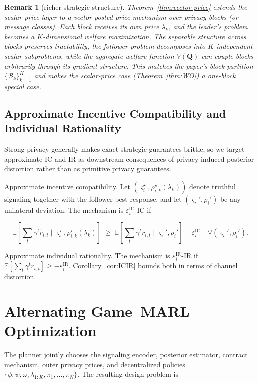 \documentclass{article}
\newtheorem{remark}{Remark}
\begin{document}
\begin{remark}
    [richer strategic structure]
    Theorem~\ref{thm:vector-price} extends the scalar-price layer to a vector posted-price mechanism over privacy blocks (or message classes). Each block receives its own price $\lambda_k$, and the leader's problem becomes a $K$-dimensional welfare maximization. The separable structure across blocks preserves tractability, the follower problem decomposes into $K$ independent scalar subproblems, while the aggregate welfare function $V(\mathbf Q)$ can couple blocks arbitrarily through its gradient structure. This matches the paper's block partition $\{\mathcal{B}_k\}_{k=1}^K$ and makes the scalar-price case (Theorem~\ref{thm:WO}) a one-block special case.
\end{remark}

\subsection{Approximate Incentive Compatibility and Individual Rationality}

Strong privacy generally makes exact strategic guarantees brittle, so we target approximate IC and IR as downstream consequences of privacy-induced posterior distortion rather than as primitive privacy guarantees.

Approximate incentive compatibility.
Let $(\varsigma_i^\star, \rho_{i,k}^\star(\lambda_k))$ denote truthful signaling together with the follower best response, and let $(\varsigma_i', \rho_i')$ be any unilateral deviation. The mechanism is $\varepsilon_i^{\mathrm{IC}}$-IC if

$$\mathbb{E}\!\left[\sum_t \gamma^t \tilde r_{i,t} \mid \varsigma_i^\star, \rho_{i,k}^\star(\lambda_k)\right] \;\ge\; \mathbb{E}\!\left[\sum_t \gamma^t \tilde r_{i,t} \mid \varsigma_i', \rho_i'\right] - \varepsilon_i^{\mathrm{IC}} \quad \forall (\varsigma_i', \rho_i').$$

Approximate individual rationality. The mechanism is $\varepsilon_i^{\mathrm{IR}}$-IR if $\mathbb{E}[\sum_t \gamma^t \tilde r_{i,t}] \ge -\varepsilon_i^{\mathrm{IR}}$. Corollary~\ref{cor:ICIR} bounds both in terms of channel distortion.


\section{Alternating Game–MARL Optimization}

The planner jointly chooses the signaling encoder, posterior estimator, contract mechanism, outer privacy prices, and decentralized policies $\{\phi,\psi,\omega,\lambda_{1:K},\pi_1,\dots,\pi_N\}.$ The resulting design problem is
\end{document}
